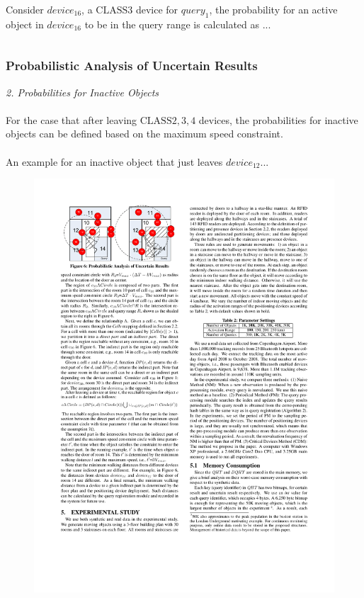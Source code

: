 \begin{frame}
\begin{columns}[c]
  Consider $device_{16}$, a $\mathrm{CLASS3}$ device for $query_1$, the probability for an active object in $device_{16}$ to be in the query range is calculated as ...

\end{columns}

\end{frame}


\begin{frame}
\frametitle{Probabilistic Analysis of Uncertain Results}

\textit{2. Probabilities for Inactive Objects}
\\~\\
For the case that after leaving $\mathrm{CLASS2,3,4}$ devices, the probabilities for inactive objects can be defined based on the maximum speed constraint.
\\~\\
An example for an inactive object that just leaves $device_{12}$...
\vspace{-5pt}
\begin{figure}[tb]
  \includegraphics[width=0.7\columnwidth]{figures/2-2/2-2-10.pdf}
\end{figure}

\end{frame}

